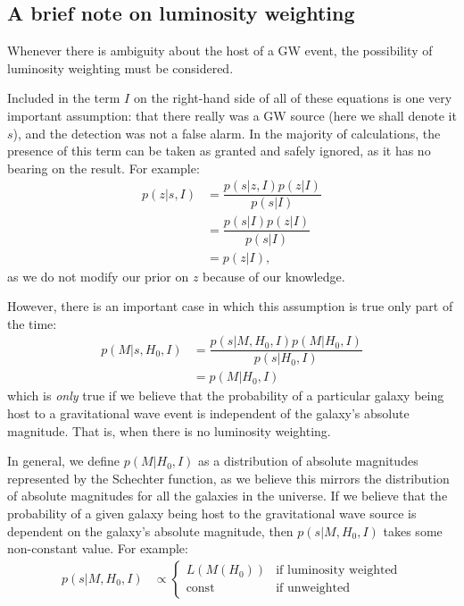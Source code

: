 \documentclass[a4paper,10pt]{article}
\begin{document}
\subsection{A brief note on luminosity weighting}
Whenever there is ambiguity about the host of a GW event, the possibility of luminosity weighting must be considered.

Included in the term $I$ on the right-hand side of all of these equations is one very important assumption: that there really was a GW source (here we shall denote it $s$), and the detection was not a false alarm.  In the majority of calculations, the presence of this term can be taken as granted and safely ignored, as it has no bearing on the result.  For example:
\begin{equation}
\begin{aligned}
p(z|s,I) &= \dfrac{p(s|z,I) p(z|I)}{p(s|I)} 
\\ &= \dfrac{p(s|I) p(z|I)}{p(s|I)} 
\\ &= p(z|I),
\end{aligned}
\end{equation}
as we do not modify our prior on $z$ because of our knowledge.

However, there is an important case in which this assumption is true only part of the time:
\begin{equation}
\begin{aligned}
p(M|s,H_0,I) &= \dfrac{p(s|M,H_0,I)p(M|H_0,I)}{p(s|H_0,I)} 
\\ &= p(M|H_0,I) 
\end{aligned}
\end{equation}
which is \emph{only} true if we believe that the probability of a particular galaxy being host to a gravitational wave event is independent of the galaxy's absolute magnitude. That is, when there is no luminosity weighting.

In general, we define $p(M|H_0,I)$ as a distribution of absolute magnitudes represented by the Schechter function, as we believe this mirrors the distribution of absolute magnitudes for all the galaxies in the universe.  If we believe that the probability of a given galaxy being host to the gravitational wave source is dependent on the galaxy's absolute magnitude, then $p(s|M,H_0,I)$ takes some non-constant value.  For example:
\begin{equation}
\begin{aligned}
p(s|M,H_0,I) &\propto 
\begin{cases}
L(M(H_0)) & \text{if luminosity weighted}\\
\text{const} & \text{if unweighted}
\end{cases}
\end{aligned}
\end{equation}
\end{document}
